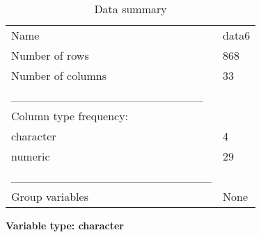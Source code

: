 \documentclass[
  letterpaper,
  DIV=11,
  numbers=noendperiod]{scrartcl}
\begin{document}
\begin{longtable}[]{@{}ll@{}}
\caption{Data summary}\tabularnewline
\toprule\noalign{}
\endfirsthead
\endhead
\bottomrule\noalign{}
\endlastfoot
Name & data6 \\
Number of rows & 868 \\
Number of columns & 33 \\
\_\_\_\_\_\_\_\_\_\_\_\_\_\_\_\_\_\_\_\_\_\_\_ & \\
Column type frequency: & \\
character & 4 \\
numeric & 29 \\
\_\_\_\_\_\_\_\_\_\_\_\_\_\_\_\_\_\_\_\_\_\_\_\_ & \\
Group variables & None \\
\end{longtable}

\textbf{Variable type: character}
\end{document}
